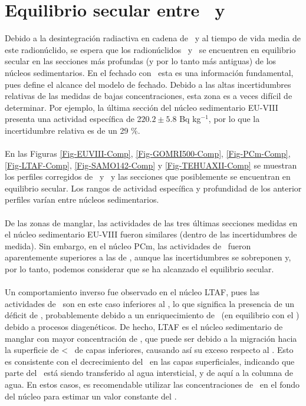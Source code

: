 	\section{Equilibrio secular entre \PbCero\, y \PbCuatro}\label{Seccion-210y214}
Debido a la desintegración radiactiva en cadena de \UDosTresOcho\, y al tiempo de vida media de este radionúclido, se espera que los radionúclidos \PbCero\, y \PbCuatro\, se encuentren en equilibrio secular en las secciones más profundas (y por lo tanto más antiguas) de los núcleos sedimentarios. En el fechado con \PbCero\, esta es una información fundamental, pues define el alcance del modelo de fechado. Debido a las altas incertidumbres relativas de las medidas de bajas concentraciones, esta zona es a veces difícil de determinar. Por ejemplo, la última sección del núcleo sedimentario EU-VIII presenta una actividad específica de 2$20.2 \pm 5.8$  Bq kg$^{-1}$, por lo que la  incertidumbre relativa es de un 29 \%. 
\\
\\
En las Figuras \ref{Fig-EUVIII-Comp}, \ref{Fig-GOMRI500-Comp}, \ref{Fig-PCm-Comp}, \ref{Fig-LTAF-Comp}, \ref{Fig-SAMO142-Comp} y \ref{Fig-TEHUAXII-Comp} se muestran los perfiles corregidos de \PbCero\, y \PbCuatro\, y las secciones que posiblemente se encuentran en equilibrio secular. Los rangos de actividad específica y profundidad de los anterior perfiles varían entre núcleos sedimentarios.
\\
\\
De las zonas de manglar, las actividades de las tres últimas secciones medidas en el núcleo sedimentario EU-VIII fueron similares (dentro de las incertidumbres de medida). Sin embargo, en el núcleo PCm, las actividades de \PbCero\, fueron aparentemente superiores a las de \PbCuatro, aunque las incertidumbres se sobreponen y, por lo tanto, podemos considerar que se ha alcanzado el equilibrio secular. 
\\
\\
Un comportamiento inverso fue observado en el núcleo LTAF, pues las actividades de \PbCero\, son en este caso inferiores al \PbCuatro, lo que significa la presencia de un déficit de \PbCero, probablemente  debido a un enriquecimiento de \Ra\, (en equilibrio con el \PbCuatro) debido a procesos diagenéticos. De hecho, LTAF es el núcleo sedimentario de manglar con mayor concentración de \PbCero, que puede ser debido a la migración hacia la superficie de \Ra<  \, de capas inferiores, causando así su exceso respecto al \PbCero. Esto es consistente con el decrecimiento del \PbCuatro\, en las capas superficiales, indicando que parte del \Ra\, está siendo transferido al agua intersticial, y de aquí a la columna de agua. En estos casos, es recomendable utilizar las concentraciones de \PbCero\, en el fondo del núcleo para estimar un valor constante del \PbCeroEx. 
